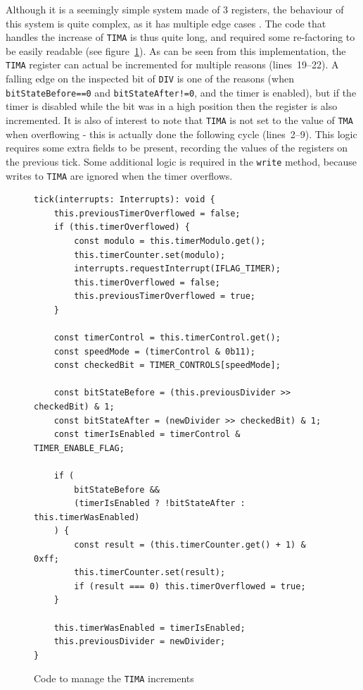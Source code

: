 \documentclass[11pt]{report}
\begin{document}
Although it is a seemingly simple system made of 3 registers, the behaviour of this system is quite complex, as it has multiple edge cases \cite[Timer obscure behaviour]{pandoc}. The code that handles the increase of \texttt{TIMA} is thus quite long, and required some re-factoring to be easily readable (see figure~\ref{fig:tima-increase}). As can be seen from this implementation, the \texttt{TIMA} register can actual be incremented for multiple reasons (lines~19--22). A falling edge on the inspected bit of \texttt{DIV} is one of the reasons (when \texttt{bitStateBefore==0} and \texttt{bitStateAfter!=0}, and the timer is enabled), but if the timer is disabled while the bit was in a high position then the register is also incremented. It is also of interest to note that \texttt{TIMA} is not set to the value of \texttt{TMA} when overflowing - this is actually done the following cycle (lines~2--9). This logic requires some extra fields to be present, recording the values of the registers on the previous tick. Some additional logic is required in the \texttt{write} method, because writes to \texttt{TIMA} are ignored when the timer overflows.

\begin{figure}[h]
    \begin{verbatim}
tick(interrupts: Interrupts): void {
    this.previousTimerOverflowed = false;
	if (this.timerOverflowed) {
        const modulo = this.timerModulo.get();
        this.timerCounter.set(modulo);
        interrupts.requestInterrupt(IFLAG_TIMER);
        this.timerOverflowed = false;
        this.previousTimerOverflowed = true;
    }
    
    const timerControl = this.timerControl.get();
    const speedMode = (timerControl & 0b11);
    const checkedBit = TIMER_CONTROLS[speedMode];

    const bitStateBefore = (this.previousDivider >> checkedBit) & 1;
    const bitStateAfter = (newDivider >> checkedBit) & 1;
    const timerIsEnabled = timerControl & TIMER_ENABLE_FLAG;

    if (
        bitStateBefore &&
        (timerIsEnabled ? !bitStateAfter : this.timerWasEnabled)
    ) {
        const result = (this.timerCounter.get() + 1) & 0xff;
        this.timerCounter.set(result);
        if (result === 0) this.timerOverflowed = true;
    }
    
    this.timerWasEnabled = timerIsEnabled;
    this.previousDivider = newDivider;
}
    \end{verbatim}
    \caption{Code to manage the \texttt{TIMA} increments}
    \label{fig:tima-increase}
\end{figure}
\end{document}
